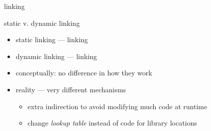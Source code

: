 
\begin{frame}{linking}
\end{frame}

\begin{frame}{static v. dynamic linking}
    \begin{itemize}
    \item static linking --- linking 
    \item dynamic linking --- linking 
    \vspace{.5cm}
    \item<2> conceptually: no difference in how they work
    \item<2> reality --- very different mechanisms
        \begin{itemize}
        \item extra indirection to avoid modifying much code at runtime
        \item change \textit{lookup table} instead of code for library locations
        \end{itemize}
    \end{itemize}
\end{frame}
